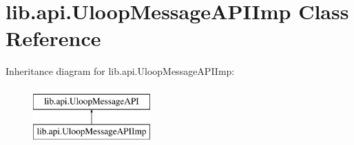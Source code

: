 \hypertarget{classlib_1_1api_1_1UloopMessageAPIImp}{\section{lib.\+api.\+Uloop\+Message\+A\+P\+I\+Imp Class Reference}
\label{classlib_1_1api_1_1UloopMessageAPIImp}
}
Inheritance diagram for lib.\+api.\+Uloop\+Message\+A\+P\+I\+Imp\+:\begin{figure}[H]
\begin{center}
\leavevmode
\includegraphics[height=2.000000cm]{classlib_1_1api_1_1UloopMessageAPIImp}
\end{center}
\end{figure}
